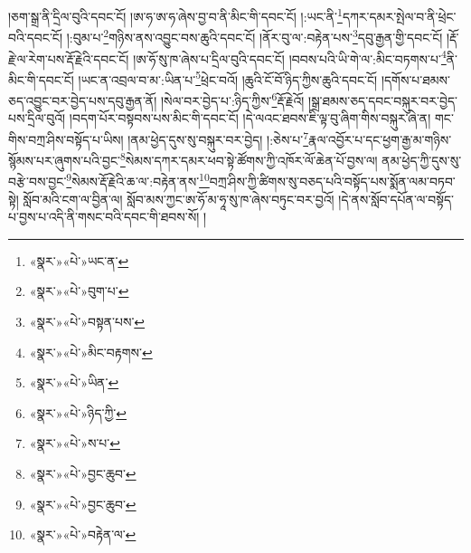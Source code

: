 །ཅག་སྒྲ་ནི་དྲིལ་བུའི་དབང་ངོ། །ཨ་ཧ་ཨ་ཧ་ཞེས་བྱ་བ་ནི་མིང་གི་དབང་ངོ། །:ཡང་ནི་\footnote{«སྣར་»«པེ་»ཡང་ན་}དཀར་དམར་སྤེལ་བ་ནི་ཕྲེང་བའི་དབང་ངོ། །:བུམ་པ་\footnote{«སྣར་»«པེ་»བུག་པ་}གཉིས་ནས་འབྱུང་བས་ཆུའི་དབང་ངོ། །ནོར་བུ་ལ་:བརྟེན་པས་\footnote{«སྣར་»«པེ་»བསྟན་པས་}དབུ་རྒྱན་གྱི་དབང་ངོ། །རྡོ་རྗེ་ལ་རེག་པས་རྡོ་རྗེའི་དབང་ངོ། །ཨ་ཧོ་སུ་ཁ་ཞེས་པ་དྲིལ་བུའི་དབང་ངོ། །བབས་པའི་ཡི་གེ་ལ་:མིང་བཏགས་པ་\footnote{«སྣར་»«པེ་»མིང་བརྟགས་}ནི་མིང་གི་དབང་ངོ། །ཡང་ན་འབྲལ་བ་མ་:ཡིན་པ་\footnote{«སྣར་»«པེ་»ཡིན་}ཕྲེང་བའོ། །ཆུའི་ངོ་བོ་ཉིད་ཀྱིས་ཆུའི་དབང་ངོ། །དགོས་པ་ཐམས་ཅད་འབྱུང་བར་བྱེད་པས་དབུ་རྒྱན་ནོ། །སེལ་བར་བྱེད་པ་:ཉིད་ཀྱིས་\footnote{«སྣར་»«པེ་»ཉིད་ཀྱི་}རྡོ་རྗེའོ། །སྒྲ་ཐམས་ཅད་དབང་བསྐུར་བར་བྱེད་པས་དྲིལ་བུའོ། །བདག་པོར་བསྟབས་པས་མིང་གི་དབང་ངོ། །དེ་ལའང་ཐབས་ཇི་ལྟ་བུ་ཞིག་གིས་བསྐུར་ཞེ་ན། གང་གིས་བཀྲ་ཤིས་བསྟོད་པ་ཡིས། །ནམ་ཕྱེད་དུས་སུ་བསྐུར་བར་བྱེད། །:ཅེས་པ་\footnote{«སྣར་»«པེ་»ས་པ་}རྣལ་འབྱོར་པ་དང་ཕྱག་རྒྱ་མ་གཉིས་སྙོམས་པར་ཞུགས་པའི་བྱང་\footnote{«སྣར་»«པེ་»བྱང་ཆུབ་}སེམས་དཀར་དམར་ཕབ་སྟེ་ཚོགས་ཀྱི་འཁོར་ལོ་ཆེན་པོ་བྱས་ལ། ནམ་ཕྱེད་ཀྱི་དུས་སུ་བརྩེ་བས་བྱང་\footnote{«སྣར་»«པེ་»བྱང་ཆུབ་}སེམས་རྡོ་རྗེའི་ཆ་ལ་:བརྟེན་ནས་\footnote{«སྣར་»«པེ་»བརྟེན་ལ་}བཀྲ་ཤིས་ཀྱི་ཚིགས་སུ་བཅད་པའི་བསྟོད་པས་སྨོན་ལམ་བཏབ་སྟེ། སློབ་མའི་ངག་ལ་བྱིན་ལ། སློབ་མས་ཀྱང་ཨ་ཧོ་མ་ཧཱ་སུ་ཁ་ཞེས་བཏུང་བར་བྱའོ། །དེ་ནས་སློབ་དཔོན་ལ་བསྟོད་པ་བྱས་པ་འདི་ནི་གསང་བའི་དབང་གི་ཐབས་སོ། །
